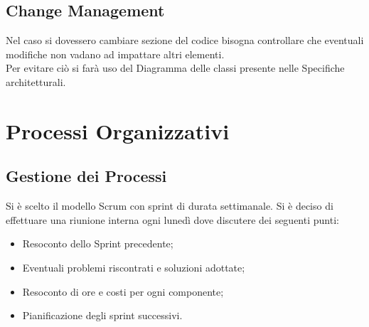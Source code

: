 \documentclass[a4paper, 12pt]{article}
\begin{document}
\subsection{Change Management}
Nel caso si dovessero cambiare sezione del codice bisogna controllare che eventuali modifiche
non vadano ad impattare altri elementi.\\
Per evitare ciò si farà uso del Diagramma delle classi presente nelle Specifiche architetturali.
\newpage
\section{Processi Organizzativi}
\subsection{Gestione dei Processi}
Si è scelto il modello Scrum con sprint di durata settimanale. Si è deciso di effettuare una riunione interna ogni lunedì dove discutere dei seguenti punti:
\begin{itemize}
    \item Resoconto dello Sprint precedente;
    \item Eventuali problemi riscontrati e soluzioni adottate;
    \item Resoconto di ore e costi per ogni componente;
    \item Pianificazione degli sprint successivi.
\end{itemize}
\end{document}
